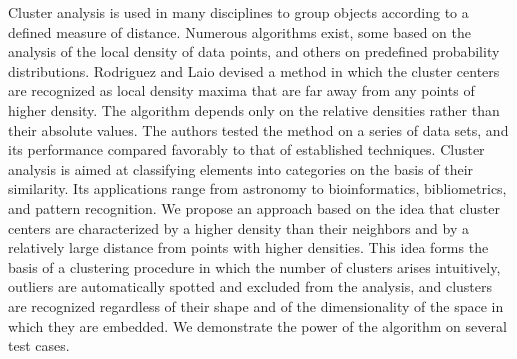 {Cluster analysis is used in many disciplines to group objects according to a defined measure of distance. Numerous algorithms exist, some based on the analysis of the local density of data points, and others on predefined probability distributions. Rodriguez and Laio devised a method in which the cluster centers are recognized as local density maxima that are far away from any points of higher density. The algorithm depends only on the relative densities rather than their absolute values. The authors tested the method on a series of data sets, and its performance compared favorably to that of established techniques. Cluster analysis is aimed at classifying elements into categories on the basis of their similarity. Its applications range from astronomy to bioinformatics, bibliometrics, and pattern recognition. We propose an approach based on the idea that cluster centers are characterized by a higher density than their neighbors and by a relatively large distance from points with higher densities. This idea forms the basis of a clustering procedure in which the number of clusters arises intuitively, outliers are automatically spotted and excluded from the analysis, and clusters are recognized regardless of their shape and of the dimensionality of the space in which they are embedded. We demonstrate the power of the algorithm on several test cases.

}
